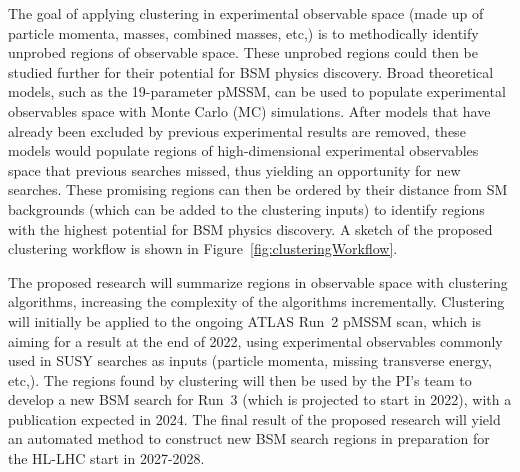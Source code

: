 \documentclass[letter, USenglish, 11pt, subfigure]{article}
\begin{document}
The goal of applying clustering in experimental observable space (made up of particle momenta, masses, combined masses, etc,) is to methodically identify unprobed regions of observable space. These unprobed regions could then be studied further for their potential for BSM physics discovery. Broad theoretical models, such as the 19-parameter pMSSM, can be used to populate experimental observables space with Monte Carlo (MC) simulations. After models that have already been excluded by previous experimental results are removed, these models would populate regions of high-dimensional experimental observables space that previous searches missed, thus yielding an opportunity for new searches. These promising regions can then be ordered by their distance from SM backgrounds (which can be added to the clustering inputs) to identify regions with the highest potential for BSM physics discovery.  A sketch of the proposed clustering workflow is shown in Figure~\ref{fig:clusteringWorkflow}.

The proposed research will summarize regions in observable space with clustering algorithms, increasing the complexity of the algorithms incrementally. Clustering will initially be applied to the ongoing ATLAS Run~2 pMSSM scan, which is aiming for a result at the end of 2022, using experimental observables commonly used in SUSY searches as inputs (particle momenta, missing transverse energy, etc,). The regions found by clustering will then be used by the PI's team to develop a new BSM search for Run~3 (which is projected to start in 2022), with a publication expected in 2024. The final result of the proposed research will yield an automated method to construct new BSM search regions in preparation for the HL-LHC start in 2027-2028.
\end{document}
